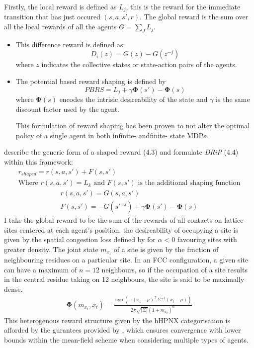 Firstly, the local reward is defined as $L_j$, this is the reward for the immediate transition
that has just occured $(s,a,s',r)$. The global reward is the sum over all the local rewards of all the agents
$G = \sum_J L_j$.
\begin{itemize}
    \item This difference reward is defined as: \[D_i(z) = G(z) - G(z^{-j})\] where $z$ indicates
    the collective states or state-action pairs of the agents.
    \item The potential based reward shaping is defined by \[PBRS = L_j + \gamma \boldsymbol \Phi(s') - \boldsymbol \Phi(s)\]
    where $\boldsymbol \Phi(s)$ encodes the intrisic desireability of the state and $\gamma$ is the same discount
    factor used by the agent. 
    \begin{displayquote}
        This formulation of reward shaping has been proven to not
        alter the optimal policy of a single agent in both infinite- andfinite- state MDPs. 
    \end{displayquote}
\end{itemize}
\cite{Devlin2014} describe the generic form of a shaped reward (4.3) and formulate \emph{DRiP} (4.4) within this framework:
\begin{equation}
    \begin{gathered}
        r_{shaped} = r(s,a,s') + F(s,s')\\
        \text{Where $r(s,a,s') = L_k$ and $F(s,s')$ is the additional shaping function}
    \end{gathered}
\end{equation}
\begin{equation}
    \begin{gathered}
        r(s,a,s') = G(s,a,s')\\
        F(s,s') = -G(s'^{-j}) + \gamma \boldsymbol \Phi(s') - \boldsymbol \Phi(s)
    \end{gathered}
\end{equation}
I take the global reward to be the sum of the rewards of all contacts on lattice
sites centered at each agent's position, the desireability of occupying a site
is given by the spatial congestion loss defined by \cite{Mguni2018} for $\alpha < 0$
favouring sites with greater density. The joint state $m_{x_t}$ of a site is given
by the fraction of neighbouring residues on a particular site. In an FCC configuration,
a given site can have a maximum of $n = 12$ neighbours, so if the occupation of a site
results in the central residue taking on 12 neighbours, the site is said to be maximally dense.
\begin{equation}
    \begin{gathered}
        \boldsymbol \Phi(m_{x_t}, x_t) = \frac{\exp (-(x_t - \mu)^\top \Sigma^{-1} (x_t - \mu))}{2 \pi \sqrt{\vert \Sigma \vert}(1 + m_{x_t})^\alpha}
    \end{gathered}
\end{equation}
This heterogenous reward structure given by the hHPNX categorisation
is afforded by the gurantees provided by \cite{Sriram2020},
which ensures convergence with lower bounds within the mean-field scheme when considering 
multiple types of agents.                
